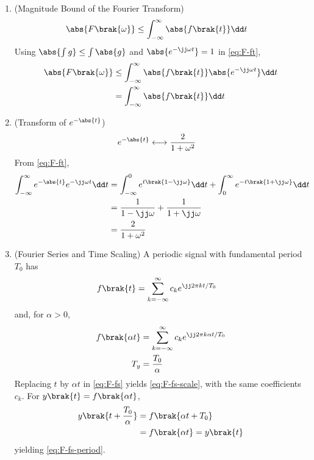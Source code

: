 \begin{enumerate}[label=\thesubsection.\arabic*, ref=\thesubsection.\theenumi, itemsep=0pt, leftmargin=0pt, labelwidth=0pt, itemindent=0pt, labelsep=1em, align=right]
\item (Magnitude Bound of the Fourier Transform)
\begin{align}
\abs{F\brak{\omega}} &\le \int_{-\infty}^{\infty} \abs{f\brak{t}} \dd t
\label{eq:F-ft-bound}
\end{align}
\solution Using $\abs{\int g} \le \int \abs{g}$ and $\abs{e^{-\jj \omega t}} = 1$ in \eqref{eq:F-ft},
\begin{align}
\abs{F\brak{\omega}} &\le \int_{-\infty}^{\infty} \abs{f\brak{t}} \abs{e^{-\jj \omega t}} \dd t
\\
&= \int_{-\infty}^{\infty} \abs{f\brak{t}} \dd t
\end{align}

\item (Transform of $e^{-\abs{t}}$)
\begin{align}
e^{-\abs{t}} &\longleftrightarrow \frac{2}{1 + \omega^2}
\label{eq:F-ft-pair}
\end{align}
\solution From \eqref{eq:F-ft},
\begin{align}
\int_{-\infty}^{\infty} e^{-\abs{t}} e^{-\jj \omega t} \dd t &= \int_{-\infty}^{0} e^{t\brak{1 - \jj \omega}} \dd t + \int_{0}^{\infty} e^{-t\brak{1 + \jj \omega}} \dd t
\\
&= \frac{1}{1 - \jj \omega} + \frac{1}{1 + \jj \omega}
\\
&= \frac{2}{1 + \omega^2}
\end{align}

\item (Fourier Series and Time Scaling) A periodic signal with fundamental period $T_0$ has
\begin{align}
f\brak{t} &= \sum_{k = -\infty}^{\infty} c_k e^{\jj 2\pi k t / T_0}
\label{eq:F-fs}
\end{align}
and, for $\alpha > 0$,
\begin{align}
f\brak{\alpha t} &= \sum_{k = -\infty}^{\infty} c_k e^{\jj 2\pi k \alpha t / T_0}
\label{eq:F-fs-scale}
\\
T_y &= \frac{T_0}{\alpha}
\label{eq:F-fs-period}
\end{align}
\solution Replacing $t$ by $\alpha t$ in \eqref{eq:F-fs} yields \eqref{eq:F-fs-scale}, with the same coefficients $c_k$. For $y\brak{t} = f\brak{\alpha t}$,
\begin{align}
y\brak{t + \frac{T_0}{\alpha}} &= f\brak{\alpha t + T_0}
\\
&= f\brak{\alpha t} = y\brak{t}
\end{align}
yielding \eqref{eq:F-fs-period}.


\end{enumerate}
